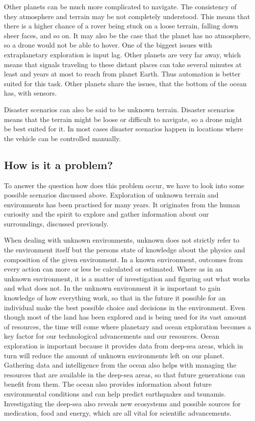 Other planets can be much more complicated to navigate. The consistency of they atmosphere and terrain may be not completely understood. This means that there is a higher chance of a rover being stuck on a loose terrain, falling down sheer faces, and so on. It may also be the case that the planet has no atmosphere, so a drone would not be able to hover. One of the biggest issues with extraplanetary exploration is input lag. Other planets are very far away, which means that signals traveling to these distant places can take several minutes at least and years at most to reach from planet Earth. Thus automation is better suited for this task. Other planets share the issues, that the bottom of the ocean has, with sensors.

Disaster scenarios can also be said to be unknown terrain. Disaster scenarios means that the terrain might be loose or difficult to navigate, so a drone might be best suited for it. In most cases disaster scenarios happen in locations where the vehicle can be controlled manually.

\subsection{How is it a problem?}

To answer the question how does this problem occur, we have to look into some possible scenarios discussed above. Exploration of unknown terrain and environments has been practised for many years. It originates from the human curiosity and the spirit to explore and gather information about our surroundings, discussed previously.

When dealing with unknown environments, unknown does not strictly refer to the environment itself but the persons state of knowledge about the physics and composition of the given environment. In a known environment, outcomes from every action can more or less be calculated or estimated. Where as in an unknown environment, it is a matter of investigation and figuring out what works and what does not. In the unknown environment it is important to gain knowledge of how everything work, so that in the future it possible for an individual make the best possible choice and decisions in the environment.\cite{aiint}
Even though most of the land has been explored and is being used for its vast amount of resources, the time will come where planetary and ocean exploration becomes a key factor for our technological advancements and our resources. Ocean exploration is important because it provides data from deep-sea areas, which in turn will reduce the amount of unknown environments left on our planet.
Gathering data and intelligence from the ocean also helps with managing the resources that are available in the deep-sea areas, so that future generations can benefit from them. The ocean also provides information about future environmental conditions and can help predict earthquakes and tsunamis. Investigating the deep-sea also reveals new ecosystems and possible sources for medication, food and energy, which are all vital for scientific advancements.\cite{oceanexplo}

